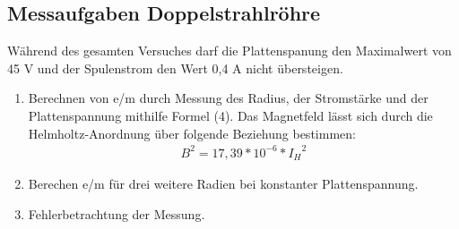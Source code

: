 \documentclass[a4paper,10pt]{scrartcl}
\begin{document}
	\subsection{Messaufgaben Doppelstrahlröhre}
Während des gesamten Versuches darf die Plattenspanung den Maximalwert von 45 V und der Spulenstrom den Wert 0,4 A nicht übersteigen.
	 \begin{enumerate}
	 \item Berechnen von e/m durch Messung des Radius, der Stromstärke und der Plattenspannung mithilfe Formel (4).
	 Das
Magnetfeld lässt sich durch die Helmholtz-Anordnung über folgende Beziehung bestimmen:
\begin{align*}
B^2=17,39*10^{-6}*{I_H}^2
\end{align*}
	 \item Berechen e/m für drei weitere Radien bei konstanter Plattenspannung.
	 \item Fehlerbetrachtung der Messung.
	 \end{enumerate}
	
    
	
	
	
	
	
\end{document}
